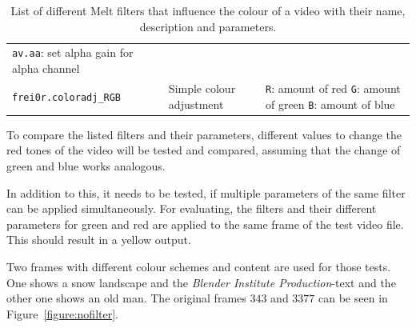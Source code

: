 \documentclass[../MasterThesis.tex]{subfiles}
\begin{document}
\begin{table}[H]
\begin{tabular}{lp{4.4cm}p{4.5cm}}
{		\texttt{av.aa}: set alpha gain for alpha channel}
		\\
		\texttt{frei0r.coloradj\_RGB} & Simple colour adjustment & 
		\tiny{
		\texttt{R}: amount of red \newline 
		\texttt{G}: amount of green \newline 
		\texttt{B}: amount of blue}
		\\
		\bottomrule
	\end{tabular}
	\caption[List of Melt filters that influence the colour of a video.]{List of different Melt filters that influence the colour of a video with their name, description and parameters.}
	\label{table:filter}
\end{table}






%


To compare the listed filters and their parameters, different values to change the red tones of the video will be tested and compared, assuming that the change of green and blue works analogous.

In addition to this, it needs to be tested, if multiple parameters of the same filter can be applied simultaneously. For evaluating, the filters and their different parameters for green and red are applied to the same frame of the test video file. This should result in a yellow output. 

Two frames with different colour schemes and content are used for those tests. One shows a snow landscape and the \textit{Blender Institute Production}-text and the other one shows an old man. The original frames $343$ and $3377$ can be seen in Figure~\ref{figure:nofilter}.
\end{document}
